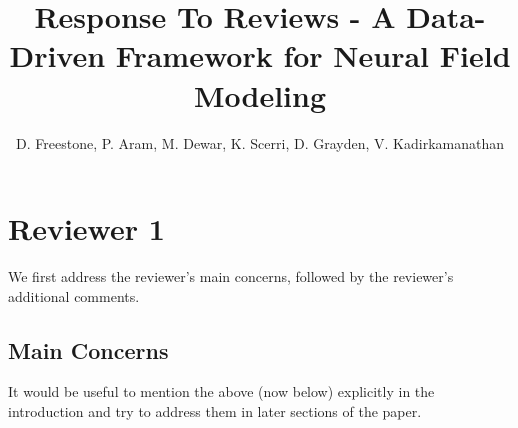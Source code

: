 \documentclass{article}
\title{Response To Reviews - A Data-Driven Framework for Neural Field Modeling}
\author{D. Freestone, P. Aram, M. Dewar, K. Scerri, D. Grayden, V. Kadirkamanathan}
\begin{document}
    \maketitle
    
    \section{Reviewer 1}
    
        We first address the reviewer's main concerns, followed by the reviewer's additional comments.
        
    \subsection{Main Concerns}
    It would be useful to mention the above (now below) explicitly in the introduction and try to address them in later sections of the paper.
\end{document}
